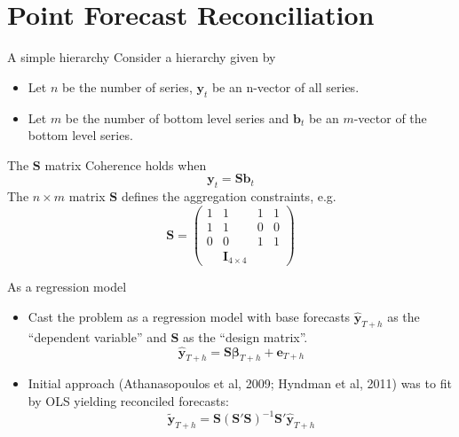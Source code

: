 \documentclass{beamer}
\begin{document}
  \section{Point Forecast Reconciliation}
 \begin{frame}{A simple hierarchy}
  	Consider a hierarchy given by
  	\begin{figure}
	    \begin{center}
		  
		 
		\qobitree
	    \end{center}
    \end{figure}
    \begin{itemize}
    	\item Let $n$ be the number of series, $\bm{y}_t$ be an n-vector of all series.
    	\pause\item Let {\color{blue}$m$} be the number of bottom level series and {\color{blue}$\bm{b}_t$} be an {\color{blue}$m$}-vector of the bottom level series.
    \end{itemize}    
\end{frame}  
\begin{frame}{The ${\bm S}$ matrix}
  Coherence holds when
  \begin{equation*}
  {\bm y}_t={\bm S}{\bm b}_t
  \end{equation*} 
    The $n\times m$ matrix ${\bm S}$ defines the aggregation constraints, e.g.
    \begin{equation*}
    {\bm S}=\begin{pmatrix} 1 &1 &1 &1 \\1 &1 &0 &0 \\0 &0 &1 &1 \\ &{\bm I_{4\times 4}}
    \end{pmatrix}  
    \end{equation*}    
\end{frame}
\begin{frame}{As a regression model}
  \begin{itemize}
  	\item Cast the problem as a regression model with base forecasts $\hat{\bm{y}}_{T+h}$ as the ``dependent variable'' and ${\bm S}$ as the ``design matrix''. 
  	\begin{equation*}
  	\hat{\bm{y}}_{T+h}={\bm{S}}{\bm\beta}_{T+h}+{\bm e}_{T+h}
  	\end{equation*}
  	\item Initial approach (Athanasopoulos et al, 2009; Hyndman et al, 2011) was to fit by OLS  yielding reconciled forecasts:
  	\begin{equation*}
  	\tilde{\bm{y}}_{T+h}={\bm S}({\bm S}'{\bm S})^{-1}{\bm S}'{\hat{\bm{y}}}_{T+h}
  	\end{equation*}
  \end{itemize}
\end{frame}
\end{document}
